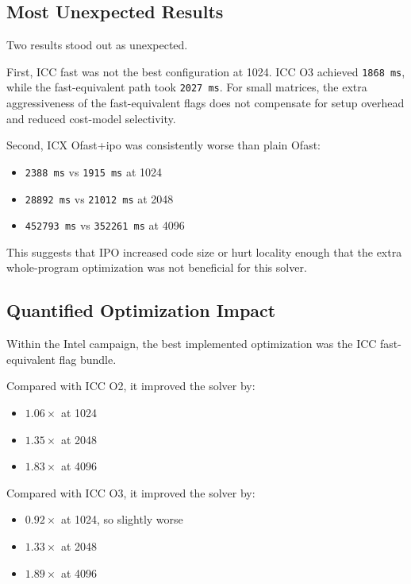 \documentclass[11pt,a4paper]{article}
\begin{document}
\subsection{Most Unexpected Results}

Two results stood out as unexpected.

First, ICC fast was not the best configuration at 1024. ICC O3 achieved
\texttt{1868 ms}, while the fast-equivalent path took \texttt{2027 ms}. For
small matrices, the extra aggressiveness of the fast-equivalent flags does not
compensate for setup overhead and reduced cost-model selectivity.

Second, ICX Ofast+ipo was consistently worse than plain Ofast:

\begin{itemize}
\item \texttt{2388 ms} vs \texttt{1915 ms} at 1024
\item \texttt{28892 ms} vs \texttt{21012 ms} at 2048
\item \texttt{452793 ms} vs \texttt{352261 ms} at 4096
\end{itemize}

This suggests that IPO increased code size or hurt locality enough that the
extra whole-program optimization was not beneficial for this solver.

\subsection{Quantified Optimization Impact}

Within the Intel campaign, the best implemented optimization was the ICC
fast-equivalent flag bundle.

Compared with ICC O2, it improved the solver by:

\begin{itemize}
\item $1.06\times$ at 1024
\item $1.35\times$ at 2048
\item $1.83\times$ at 4096
\end{itemize}

Compared with ICC O3, it improved the solver by:

\begin{itemize}
\item $0.92\times$ at 1024, so slightly worse
\item $1.33\times$ at 2048
\item $1.89\times$ at 4096
\end{itemize}
\end{document}
